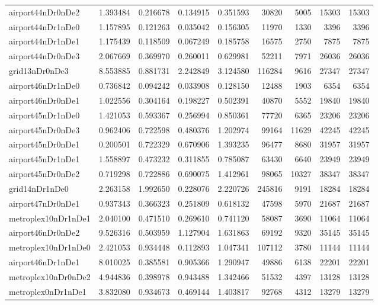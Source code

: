 \begin{longtable}{|l|r|r|r|r|r|r|r|r|}
airport44nDr0nDe2 & 1.393484 & 0.216678 & 0.134915 & 0.351593 & 30820 & 5005 & 15303 & 15303 \\
airport44nDr1nDe0 & 1.157895 & 0.121263 & 0.035042 & 0.156305 & 11970 & 1330 & 3396 & 3396 \\
airport44nDr1nDe1 & 1.175439 & 0.118509 & 0.067249 & 0.185758 & 16575 & 2750 & 7875 & 7875 \\
airport44nDr0nDe3 & 2.067669 & 0.369970 & 0.260011 & 0.629981 & 52211 & 7971 & 26036 & 26036 \\
grid13nDr0nDe3 & 8.553885 & 0.881731 & 2.242849 & 3.124580 & 116284 & 9616 & 27347 & 27347 \\
airport46nDr1nDe0 & 0.736842 & 0.094242 & 0.033908 & 0.128150 & 12488 & 1903 & 6354 & 6354 \\
airport46nDr0nDe1 & 1.022556 & 0.304164 & 0.198227 & 0.502391 & 40870 & 5552 & 19840 & 19840 \\
airport45nDr1nDe0 & 1.421053 & 0.593367 & 0.256994 & 0.850361 & 77720 & 6365 & 23206 & 23206 \\
airport45nDr0nDe3 & 0.962406 & 0.722598 & 0.480376 & 1.202974 & 99164 & 11629 & 42245 & 42245 \\
airport45nDr0nDe1 & 0.200501 & 0.722329 & 0.670906 & 1.393235 & 96477 & 8680 & 31957 & 31957 \\
airport45nDr1nDe1 & 1.558897 & 0.473232 & 0.311855 & 0.785087 & 63430 & 6640 & 23949 & 23949 \\
airport45nDr0nDe2 & 0.719298 & 0.722886 & 0.690075 & 1.412961 & 98065 & 10327 & 38347 & 38347 \\
grid14nDr1nDe0 & 2.263158 & 1.992650 & 0.228076 & 2.220726 & 245816 & 9191 & 18284 & 18284 \\
airport47nDr0nDe1 & 0.937343 & 0.366323 & 0.251809 & 0.618132 & 47598 & 5970 & 21687 & 21687 \\
metroplex10nDr1nDe1 & 2.040100 & 0.471510 & 0.269610 & 0.741120 & 58087 & 3690 & 11064 & 11064 \\
airport46nDr0nDe2 & 9.526316 & 0.503959 & 1.127904 & 1.631863 & 69192 & 9320 & 35145 & 35145 \\
metroplex10nDr1nDe0 & 2.421053 & 0.934448 & 0.112893 & 1.047341 & 107112 & 3780 & 11144 & 11144 \\
airport46nDr1nDe1 & 8.010025 & 0.385581 & 0.905366 & 1.290947 & 49886 & 6138 & 22201 & 22201 \\
metroplex10nDr0nDe2 & 4.944836 & 0.398978 & 0.943488 & 1.342466 & 51532 & 4397 & 13128 & 13128 \\
metroplex0nDr1nDe1 & 3.832080 & 0.934673 & 0.469144 & 1.403817 & 92768 & 4312 & 13279 & 13279 \\

\end{longtable}
